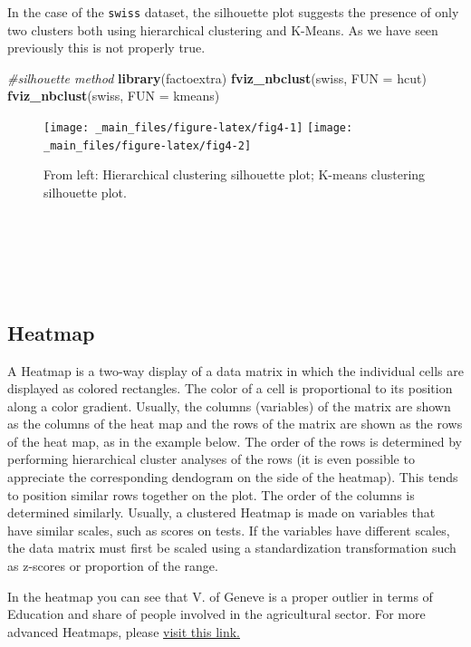 \documentclass[
]{article}
\newenvironment{Shaded}{\begin{snugshade}}{\end{snugshade}}
\newcommand{\AttributeTok}[1]{\textcolor[rgb]{0.13,0.29,0.53}{#1}}
\newcommand{\CommentTok}[1]{\textcolor[rgb]{0.56,0.35,0.01}{\textit{#1}}}
\newcommand{\FunctionTok}[1]{\textcolor[rgb]{0.13,0.29,0.53}{\textbf{#1}}}
\newcommand{\NormalTok}[1]{#1}
\begin{document}
In the case of the \texttt{swiss} dataset, the silhouette plot suggests the
presence of only two clusters both using hierarchical clustering and
K-Means. As we have seen previously this is not properly true.

\begin{Shaded}
\begin{Highlighting}[]
\CommentTok{\#silhouette method}
\FunctionTok{library}\NormalTok{(factoextra) }
\FunctionTok{fviz\_nbclust}\NormalTok{(swiss, }\AttributeTok{FUN =}\NormalTok{ hcut)}
\FunctionTok{fviz\_nbclust}\NormalTok{(swiss, }\AttributeTok{FUN =}\NormalTok{ kmeans)}
\end{Highlighting}
\end{Shaded}

\begin{figure}[H]
\texttt{[image: \_main\_files/figure-latex/fig4-1]} \texttt{[image: \_main\_files/figure-latex/fig4-2]} \caption{From left: Hierarchical clustering silhouette plot; K-means clustering silhouette plot.}\label{fig:fig4}
\end{figure}

~

~

~

\hypertarget{heatmap}{%
\subsection{Heatmap}\label{heatmap}}

A Heatmap is a two-way display of a data matrix in which the individual
cells are displayed as colored rectangles. The color of a cell is
proportional to its position along a color gradient. Usually, the
columns (variables) of the matrix are shown as the columns of the heat
map and the rows of the matrix are shown as the rows of the heat map, as
in the example below. The order of the rows is determined by performing
hierarchical cluster analyses of the rows (it is even possible to
appreciate the corresponding dendogram on the side of the heatmap). This
tends to position similar rows together on the plot. The order of the
columns is determined similarly. Usually, a clustered Heatmap is made on
variables that have similar scales, such as scores on tests. If the
variables have different scales, the data matrix must first be scaled
using a standardization transformation such as z-scores or proportion of
the range.

In the heatmap you can see that V. of Geneve is a proper outlier in
terms of Education and share of people involved in the agricultural
sector. For more advanced Heatmaps, please \href{https://www.datanovia.com/en/lessons/heatmap-in-r-static-and-interactive-visualization/}{visit this link.}
\end{document}
